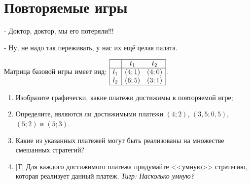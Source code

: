 \section{Повторяемые игры}
\begin{rem}
- Доктор, доктор, мы его потеряли!!!

- Ну, не надо так переживать, у нас их ещё целая палата.
\end{rem}

\begin{problem}
Матрица базовой игры имеет вид:  $\begin{array}{|c|cc|}  \hline {} & {t_{1} } & {t_{2} } \\  \hline {l_{1} } & {\left(4;1\right)} & {\left(4;0\right)} \\ {l_{2} } & {\left(6;5\right)} & {\left(3;1\right)} \\  \hline  \end{array}$.
\begin{enumerate}
\item       Изобразите графически, какие платежи достижимы в повторяемой игре;

\item      Определите, являются ли достижимыми платежи  $\left(4;2\right)$,  $\left(3,5;0,5\right)$,  $\left(5;2\right)$  и  $\left(5;3\right)$.

\item       Какие из указанных платежей могут быть реализованы на множестве смешанных стратегий?

\item $[$Т$]$ Для каждого достижимого платежа придумайте <<умную>> стратегию, которая реализует данный платеж. {\it Тигр: Насколько умную?}
\end{enumerate}


\begin{sol}

\end{sol}
\end{problem}



